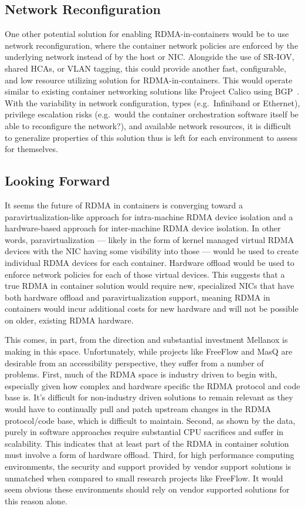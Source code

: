 \documentclass[12pt,titlepage]{article}
\begin{document}
\subsection{Network Reconfiguration}
One other potential solution for enabling RDMA-in-containers would be to use network reconfiguration, where the container network policies are enforced by the underlying network instead of by the host or NIC\@.
Alongside the use of SR-IOV, shared HCAs, or VLAN tagging, this could provide another fast, configurable, and low resource utilizing solution for RDMA-in-containers.
This would operate similar to existing container networking solutions like Project Calico using BGP~\cite{caliconetwork}.
With the variability in network configuration, types (e.g.\ Infiniband or Ethernet), privilege escalation risks (e.g.\ would the container orchestration software itself be able to reconfigure the network?), and available network resources, it is difficult to generalize properties of this solution thus is left for each environment to assess for themselves.

\subsection{Looking Forward}
It seems the future of RDMA in containers is converging toward a paravirtualization-like approach for intra-machine RDMA device isolation and a hardware-based approach for inter-machine RDMA device isolation.
In other words, paravirtualization --- likely in the form of kernel managed virtual RDMA devices with the NIC having some visibility into those --- would be used to create individual RDMA devices for each container.
Hardware offload would be used to enforce network policies for each of those virtual devices. 
This suggests that a true RDMA in container solution would require new, specialized NICs that have both hardware offload and paravirtualization support, meaning RDMA in containers would incur additional costs for new hardware and will not be possible on older, existing RDMA hardware. 

This comes, in part, from the direction and substantial investment Mellanox is making in this space.
Unfortunately, while projects like FreeFlow and MasQ are desirable from an accessibility perspective, they suffer from a number of problems.
First, much of the RDMA space is industry driven to begin with, especially given how complex and hardware specific the RDMA protocol and code base is.
It's difficult for non-industry driven solutions to remain relevant as they would have to continually pull and patch upstream changes in the RDMA protocol/code base, which is difficult to maintain.
Second, as shown by the data, purely in software approaches require substantial CPU sacrifices and suffer in scalability. 
This indicates that at least part of the RDMA in container solution must involve a form of hardware offload.
Third, for high performance computing environments, the security and support provided by vendor support solutions is unmatched when compared to small research projects like FreeFlow. 
It would seem obvious these environments should rely on vendor supported solutions for this reason alone.
\end{document}
